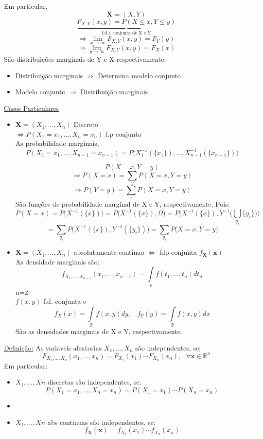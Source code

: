 \documentclass[a4paper,12pt]{article}
\begin{document}
\begin{enumerate}
Em particular,
$$\bm X=(X,Y) $$
$$ \underbrace{F_{X,Y}(x,y) = P(X\le  x,Y\le y)}_{\text{f.d.a conjunta de X e Y}} $$
$$\Rightarrow \lim\limits_{x\rightarrow \infty} F_{X,Y}(x,y)=F_Y(y) $$
$$\Rightarrow \lim\limits_{y\rightarrow \infty} F_{X,Y}(x,y)=F_X(x) $$
São distribuições marginais de Y e X respectivamente.
\begin{itemize}
	\item Distribuição marginais $\not\Rightarrow$ Determina modelo conjunto
	\item Modelo conjunto $\Rightarrow$ Distribuição marginais
\end{itemize}
\underline{Casos Particulares}\\

\begin{itemize}
	\item  $\bm X=(X_1,\ldots,X_n)$ Discreto\\
	$\Rightarrow P(X_1=x_1,\ldots, X_n=x_n) $ f.p conjunta \\
	As probabilidade marginais,
	$$P(X_1=x_1,\ldots,X_{n-1}=x_{n-1})
	=
	P\bigg( X_1^{-1}(\{x_1\}),\ldots, X_{n-1}^{-1}(\{x_{n-1}\})\bigg)
	 $$

$$P(X=x,Y=y)$$
$$ \Rightarrow  P(X=x)=\sum\limits_{y}P(X=x,Y=y)$$
$$ \Rightarrow  P(Y=y)=\sum\limits_{x}P(X=x,Y=y)$$
São funções de probabilidade marginal de X e Y, respectivamente, Pois:\\
$$P(X=x)=P\bigg(X^{-1}(\{x\}) \bigg) = P\bigg(X^{-1}(\{x\}),\Omega \bigg) 
=
 P\bigg(X^{-1}(\{x\}),Y^{-1}\bigg(
\bigcup_{y_i}\{y_i\}  \bigg) \bigg)
$$
$$
=\sum\limits_{y_i}P\bigg(
X^{-1}(\{x \}),Y^{-1}(\{y_i\})\bigg)
=\sum\limits_{y_i}P\bigg(X=x,Y=y
\bigg)
$$
\item $\bm X = (X_1,\ldots,X_n)$ absolutamente continuo $\Leftrightarrow$ fdp conjunta $f_{\bm X}(\bm x)$\\
As densidade marginais são:
$$f_{X_1,\ldots,X_{n-1}}(x_1,\ldots,x_{n-1})=\int\limits_{\mathbb R}f(t_1,\ldots,t_n)dt_n $$
n=2:\\
$f(x,y)$ f.d. conjunta e 
$$f_X(x)= \int\limits_{\mathbb R}f(x,y)dy, \ \ \ \ f_Y(y)= \int\limits_{\mathbb R}f(x,y)dx $$
São as densidades marginais de X e Y, respectivamente. 
\end{itemize}
\end{enumerate}
\underline{Definição:} As variaveis aleatorias $X_1,\ldots,X_n$ são independentes, se:
$$F_{X_1,\ldots,X_n}(x_1,\ldots,x_n)=F_{X_1}(x_1)\cdots F_{X_n}(x_n), \ \ \ \forall
\bm x\in \mathbb R^n$$
Em particular:\\
\begin{itemize}
	\item $X_1,\ldots,Xn $ discretas  são independentes, se:\\
	 $$P(X_1=x_1,\ldots,X_n=x_n)=P(X_1=x_1)\cdots P(X_n=x_n)$$
	 \item \item $X_1,\ldots,Xn $ abs continuas  são independentes, se:\\
	 $$f_{\bm X}(\bm x)= f_{X_1}(x_1)\cdots f_{X_n}(x_n) $$
\end{itemize}
\newpage
\end{document}
